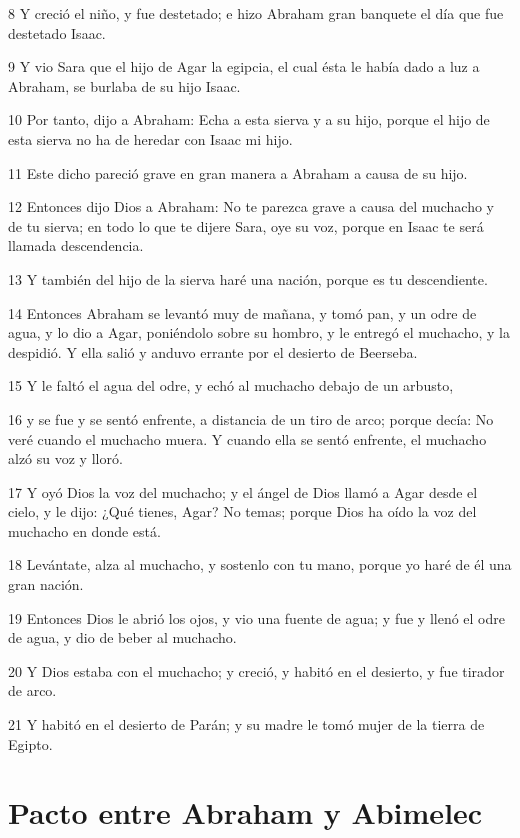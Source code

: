 \par 8 Y creció el niño, y fue destetado; e hizo Abraham gran banquete el día que fue destetado Isaac.
\par 9 Y vio Sara que el hijo de Agar la egipcia, el cual ésta le había dado a luz a Abraham, se burlaba de su hijo Isaac.
\par 10 Por tanto, dijo a Abraham: Echa a esta sierva y a su hijo, porque el hijo de esta sierva no ha de heredar con Isaac mi hijo.
\par 11 Este dicho pareció grave en gran manera a Abraham a causa de su hijo.
\par 12 Entonces dijo Dios a Abraham: No te parezca grave a causa del muchacho y de tu sierva; en todo lo que te dijere Sara, oye su voz, porque en Isaac te será llamada descendencia.
\par 13 Y también del hijo de la sierva haré una nación, porque es tu descendiente.
\par 14 Entonces Abraham se levantó muy de mañana, y tomó pan, y un odre de agua, y lo dio a Agar, poniéndolo sobre su hombro, y le entregó el muchacho, y la despidió. Y ella salió y anduvo errante por el desierto de Beerseba.
\par 15 Y le faltó el agua del odre, y echó al muchacho debajo de un arbusto,
\par 16 y se fue y se sentó enfrente, a distancia de un tiro de arco; porque decía: No veré cuando el muchacho muera. Y cuando ella se sentó enfrente, el muchacho alzó su voz y lloró.
\par 17 Y oyó Dios la voz del muchacho; y el ángel de Dios llamó a Agar desde el cielo, y le dijo: ¿Qué tienes, Agar? No temas; porque Dios ha oído la voz del muchacho en donde está.
\par 18 Levántate, alza al muchacho, y sostenlo con tu mano, porque yo haré de él una gran nación.
\par 19 Entonces Dios le abrió los ojos, y vio una fuente de agua; y fue y llenó el odre de agua, y dio de beber al muchacho.
\par 20 Y Dios estaba con el muchacho; y creció, y habitó en el desierto, y fue tirador de arco.
\par 21 Y habitó en el desierto de Parán; y su madre le tomó mujer de la tierra de Egipto.

\section*{Pacto entre Abraham y Abimelec}

